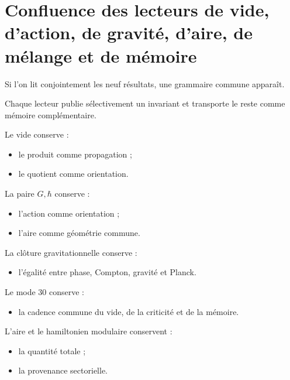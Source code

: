 \section{Confluence des lecteurs de vide, d’action, de gravité, d’aire, de mélange et de mémoire}

Si l’on lit conjointement les neuf résultats, une grammaire commune apparaît.\par

Chaque lecteur publie sélectivement un invariant et transporte le reste comme mémoire complémentaire.\par

Le vide conserve :\par

\begin{itemize}[leftmargin=*,itemsep=0.35em]
\item le produit comme propagation ;
\item le quotient comme orientation.
\end{itemize}

La paire \(G,\hbar\) conserve :\par

\begin{itemize}[leftmargin=*,itemsep=0.35em]
\item l’action comme orientation ;
\item l’aire comme géométrie commune.
\end{itemize}

La clôture gravitationnelle conserve :\par

\begin{itemize}[leftmargin=*,itemsep=0.35em]
\item l’égalité entre phase, Compton, gravité et Planck.
\end{itemize}

Le mode \(30\) conserve :\par

\begin{itemize}[leftmargin=*,itemsep=0.35em]
\item la cadence commune du vide, de la criticité et de la mémoire.
\end{itemize}

L’aire et le hamiltonien modulaire conservent :\par

\begin{itemize}[leftmargin=*,itemsep=0.35em]
\item la quantité totale ;
\item la provenance sectorielle.
\end{itemize}

